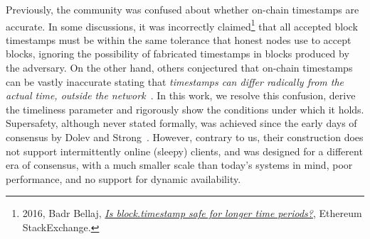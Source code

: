 Previously, the community was confused about whether on-chain timestamps are accurate.
In some discussions, it was incorrectly
claimed\footnote{2016, Badr Bellaj, \href{https://ethereum.stackexchange.com/a/9752}{\emph{Is block.timestamp safe for longer time periods?}}, Ethereum StackExchange.} that all accepted block timestamps must be within the same tolerance that honest nodes use to accept blocks, ignoring the possibility of fabricated timestamps in blocks produced by the adversary.
On the other hand, others conjectured that on-chain timestamps can be vastly
inaccurate stating that \emph{timestamps can differ radically from the
actual time, outside the network}~\cite{szalachowski2018short}.
In this work, we resolve this confusion, derive the timeliness parameter and rigorously show the conditions under which it holds.
Supersafety, although never stated formally, was achieved since the early
days of consensus by Dolev and Strong~\cite{dolev-strong}.
However, contrary to us, their construction does not support intermittently online (sleepy) clients,
and was designed for a different era of consensus, with a much smaller scale
than today's systems in mind, poor performance, and no support for dynamic availability.
